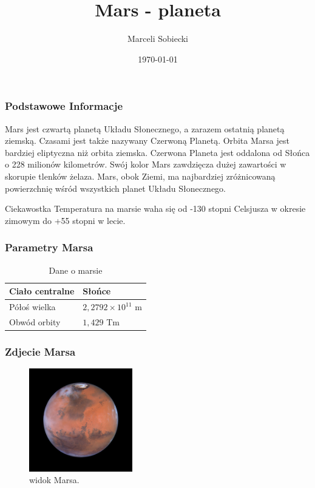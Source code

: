 \documentclass{beamer}
\title{Mars - planeta}
\author{Marceli Sobiecki}
\institute[WMiI UWM]{Wydział Matematyki i Informatyki.\\
Uniwersytet Warmińsko-Mazurski w Olsztynie}
\date{\today}
\begin{document}
\maketitle


\begin{frame}
\frametitle{Podstawowe Informacje}

Mars jest \alert{czwartą planetą Układu Słonecznego}, a zarazem ostatnią planetą ziemską. Czasami jest także nazywany Czerwoną Planetą. Orbita Marsa jest bardziej eliptyczna niż orbita ziemska. Czerwona Planeta jest oddalona od Słońca o 228 milionów kilometrów. Swój kolor Mars zawdzięcza dużej zawartości w skorupie tlenków żelaza. Mars, obok Ziemi, ma najbardziej zróżnicowaną powierzchnię wśród wszystkich planet Układu Słonecznego.
\begin{block}{Ciekawostka}
Temperatura na marsie waha się od -130 stopni Celsjusza w okresie zimowym do +55 stopni w lecie.
\end{block}
\end{frame}

\begin{frame}
\frametitle{Parametry Marsa}
\begin{table}[h]
\centering
\begin{tabular}{|l|l|}
\hline
Ciało centralne & Słońce        \\ \hline
Półoś wielka    & $2,2792\times 10^{11}$ m \\ \hline
Obwód orbity    & $1,429$ Tm      \\ \hline
\end{tabular}
\caption{Dane o marsie}
\end{table}
\end{frame}

\begin{frame}
\frametitle{Zdjecie Marsa}
\begin{figure}[h]
\centering
\includegraphics[width=0.4\textwidth]{mars.jpg}
\caption{widok Marsa.}
\end{figure}
\end{frame}
\end{document}

